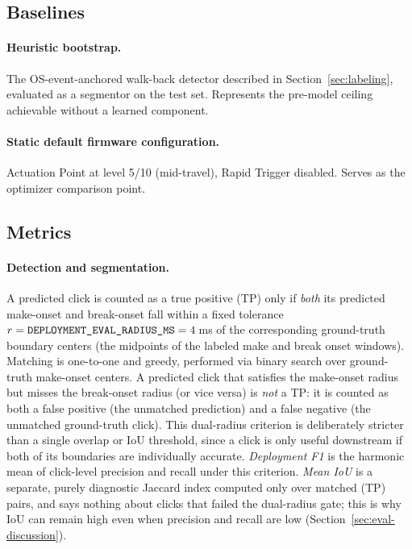 \subsection{Baselines}

\paragraph{Heuristic bootstrap.} The OS-event-anchored walk-back detector described
in Section~\ref{sec:labeling}, evaluated as a segmentor on the test set.
Represents the pre-model ceiling achievable without a learned component.

\paragraph{Static default firmware configuration.} Actuation Point at level 5/10
(mid-travel), Rapid Trigger disabled. Serves as the optimizer comparison point.

\subsection{Metrics}
\paragraph{Detection and segmentation.}
A predicted click is counted as a true positive (TP) only if \emph{both} its
predicted make-onset and break-onset fall within a fixed tolerance
$r=\text{\texttt{DEPLOYMENT\_EVAL\_RADIUS\_MS}}=4$\,ms of the corresponding
ground-truth boundary centers (the midpoints of the labeled make and break
onset windows). Matching is one-to-one and greedy, performed via binary search
over ground-truth make-onset centers. A predicted click that satisfies the
make-onset radius but misses the break-onset radius (or vice versa) is
\emph{not} a TP: it is counted as both a false positive (the unmatched
prediction) and a false negative (the unmatched ground-truth click). This
dual-radius criterion is deliberately stricter than a single overlap or IoU
threshold, since a click is only useful downstream if both of its boundaries
are individually accurate. \emph{Deployment F1} is the harmonic mean of
click-level precision and recall under this criterion. \emph{Mean IoU} is a
separate, purely diagnostic Jaccard index computed only over matched (TP)
pairs, and says nothing about clicks that failed the dual-radius gate; this is
why IoU can remain high even when precision and recall are low
(Section~\ref{sec:eval-discussion}).

